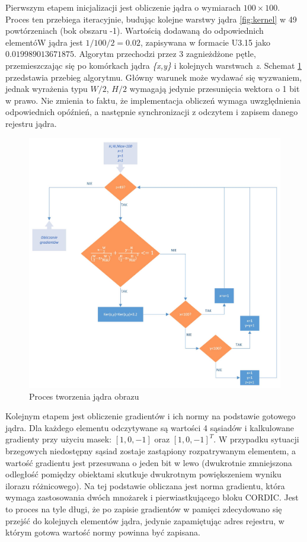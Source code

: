 Pierwszym etapem inicjalizacji jest obliczenie jądra o wymiarach $100\times 100$. Proces ten przebiega iteracyjnie, budując kolejne warstwy jądra \ref{fig:kernel} w 49 powtórzeniach (bok obszaru -1). Wartością dodawaną do odpowiednich elementóW jądra jest $1/100/2=0.02$, zapisywana w formacie U3.15 jako $0.019989013671875$. Algorytm przechodzi przez 3 zagnieżdżone pętle, przemieszczając się po komórkach jądra \textit{\{x,y\}} i kolejnych warstwach \textit{z}. Schemat \ref{fig:kernel_build} przedstawia przebieg algorytmu. Główny warunek może wydawać się wyzwaniem, jednak wyrażenia typu $W/2$, $H/2$ wymagają jedynie przesunięcia wektora o 1 bit w prawo. Nie zmienia to faktu, że implementacja obliczeń wymaga uwzględnienia odpowiednich opóźnień, a następnie synchronizacji z odczytem i zapisem danego rejestru jądra.
\begin{figure}[h]
	\centering
	\includegraphics[width=15cm]{4_kernel.jpg}
	\caption{Proces tworzenia jądra obrazu}
	\label{fig:kernel_build}
\end{figure}

Kolejnym etapem jest obliczenie gradientów i ich normy na podstawie gotowego jądra. Dla każdego elementu odczytywane są wartości 4 sąsiadów i kalkulowane gradienty przy użyciu masek: $[1,0,-1]$ oraz $[1,0,-1]^T$. W przypadku sytuacji brzegowych niedostępny sąsiad zostaje zastąpiony rozpatrywanym elementem, a wartość gradientu jest przesuwana o jeden bit w lewo (dwukrotnie zmniejszona odległość pomiędzy obiektami skutkuje dwukrotnym powiększeniem wyniku ilorazu różnicowego).  Na tej podstawie obliczana jest norma gradientu, która wymaga zastosowania dwóch mnożarek i pierwiastkującego bloku CORDIC. Jest to proces na tyle długi, że po zapisie gradientów w pamięci zdecydowano się przejść do kolejnych elementów jądra, jedynie zapamiętując adres rejestru, w którym gotowa wartość normy powinna być zapisana.

